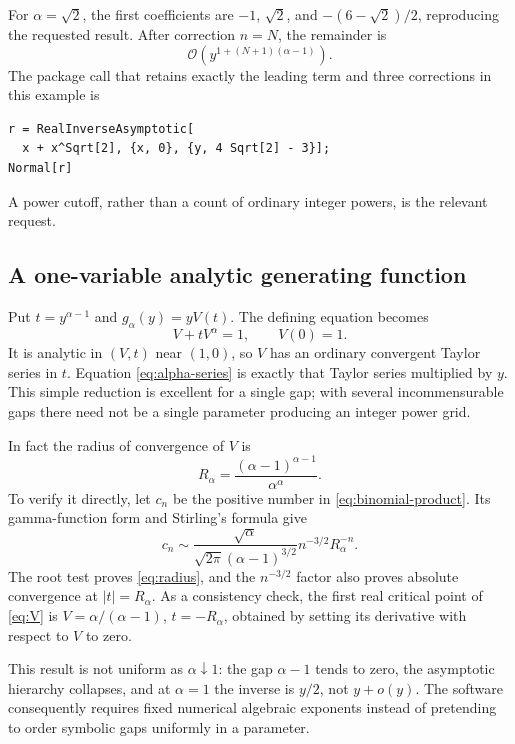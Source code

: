 \documentclass[11pt,a4paper]{article}
\numberwithin{equation}{section}
\theoremstyle{definition}
\theoremstyle{remark}
\newcommand{\OO}{\mathcal O}
\begin{document}
For $\alpha=\sqrt2$, the first coefficients are $-1$, $\sqrt2$, and
$-(6-\sqrt2)/2$, reproducing the requested result.
After correction $n=N$, the remainder is
\begin{equation}
 \OO\left(y^{1+(N+1)(\alpha-1)}\right).
 \label{eq:alpha-remainder}
\end{equation}
The package call that retains exactly the leading term and three corrections
in this example is
\begin{lstlisting}
r = RealInverseAsymptotic[
  x + x^Sqrt[2], {x, 0}, {y, 4 Sqrt[2] - 3}];
Normal[r]
\end{lstlisting}
A power cutoff, rather than a count of ordinary integer powers, is the
relevant request.

\subsection{A one-variable analytic generating function}

Put $t=y^{\alpha-1}$ and $g_\alpha(y)=yV(t)$. The defining equation becomes
\begin{equation}
 V+tV^\alpha=1,\qquad V(0)=1.
 \label{eq:V}
\end{equation}
It is analytic in $(V,t)$ near $(1,0)$, so $V$ has an ordinary convergent
Taylor series in $t$. Equation \eqref{eq:alpha-series} is exactly that
Taylor series multiplied by $y$. This simple reduction is excellent for a
single gap; with several incommensurable gaps there need not be a single
parameter producing an integer power grid.

In fact the radius of convergence of $V$ is
\begin{equation}
 R_\alpha=\frac{(\alpha-1)^{\alpha-1}}{\alpha^\alpha}.
 \label{eq:radius}
\end{equation}
To verify it directly, let $c_n$ be the positive number in
\eqref{eq:binomial-product}. Its gamma-function form and Stirling's formula
give
\begin{equation}
 c_n\sim\frac{\sqrt\alpha}{\sqrt{2\pi}(\alpha-1)^{3/2}}
 n^{-3/2}R_\alpha^{-n}.
 \label{eq:cn-asymptotic}
\end{equation}
The root test proves \eqref{eq:radius}, and the $n^{-3/2}$ factor also proves
absolute convergence at $|t|=R_\alpha$. As a consistency check, the first
real critical point of \eqref{eq:V} is
$V=\alpha/(\alpha-1)$, $t=-R_\alpha$, obtained by setting its derivative
with respect to $V$ to zero.

This result is not uniform as $\alpha\downarrow1$: the gap
$\alpha-1$ tends to zero, the asymptotic hierarchy collapses, and at
$\alpha=1$ the inverse is $y/2$, not $y+o(y)$. The software consequently
requires fixed numerical algebraic exponents instead of pretending to
order symbolic gaps uniformly in a parameter.
\end{document}
